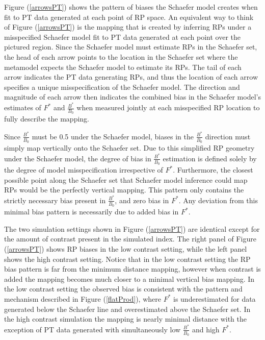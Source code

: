 %
Figure (\ref{arrowsPT}) shows the pattern of biases the Schaefer model creates when fit
to PT data generated at each point of RP space. An equivalent way to think of Figure (\ref{arrowsPT}) 
is the mapping that is created by inferring RPs under a misspecified Schaefer 
model fit to PT data generated at each point over the pictured region. Since 
the Schaefer model must estimate RPs in the Schaefer set, the head of each arrow 
points to the location in the Schaefer set where the metamodel expects the Schaefer 
model to estimate its RPs. The tail of each arrow indicates the PT data 
generating RPs, and thus the location of each arrow specifies a unique 
misspecification of the Schaefer model. The direction and magnitude of each 
arrow then indicates the combined bias in the Schaefer model's estimates of $F^*$ 
and $\frac{B^*}{B_0}$ when measured jointly at each misspecified RP location to 
fully describe the mapping.

%
Since $\frac{B^*}{B_0}$ must be 0.5 under the Schaefer model, biases in the
$\frac{B^*}{B_0}$ direction must simply map vertically onto the Schaefer set.
Due to this simplified RP geometry under the Schaefer model, the degree of bias in
$\frac{B^*}{B_0}$ estimation is defined solely by the degree of model
misspecification irrespective of $F^*$. Furthermore,
the closest possible point along the Schaefer set that Schaefer model inference %
could map RPs would be the perfectly vertical mapping. This pattern only contains the
strictly necessary bias present in $\frac{B^*}{B_0}$, and zero bias in $F^*$.
Any deviation from this minimal bias pattern is necessarily due to added bias in $F^*$.

%
The two simulation settings shown in Figure (\ref{arrowsPT}) are identical except
for the amount of contrast present in the simulated index. The right panel of
Figure (\ref{arrowsPT}) shows RP biases in the low contrast setting, while the
left panel shows the high contrast setting. Notice that in the low contrast
setting the RP bias pattern is far from the minimum distance mapping, however when
contrast is added the mapping becomes much closer to a minimal vertical bias mapping.
In the low contrast setting the observed bias is consistent with the pattern
and mechanism described in Figure (\ref{flatProd}), where $F^*$ is underestimated
for data generated below the Schaefer line and overestimated above the Schaefer set.
In the high contrast simulation the mapping is nearly minimal distance with the exception
of PT data generated with simultaneously low $\frac{B^*}{B_0}$ and high $F^*$.

